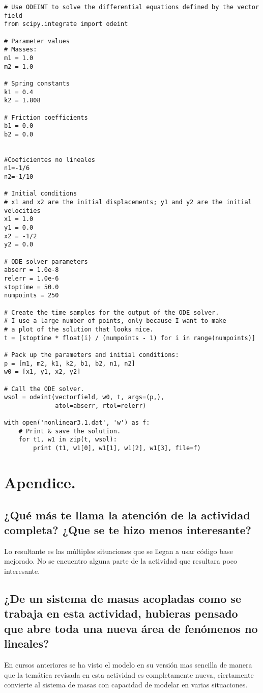 \documentclass{article}
\begin{document}
\begin{verbatim}
# Use ODEINT to solve the differential equations defined by the vector field
from scipy.integrate import odeint

# Parameter values
# Masses:
m1 = 1.0
m2 = 1.0

# Spring constants
k1 = 0.4
k2 = 1.808

# Friction coefficients
b1 = 0.0
b2 = 0.0


#Coeficientes no lineales
n1=-1/6
n2=-1/10

# Initial conditions
# x1 and x2 are the initial displacements; y1 and y2 are the initial velocities
x1 = 1.0
y1 = 0.0
x2 = -1/2
y2 = 0.0

# ODE solver parameters
abserr = 1.0e-8
relerr = 1.0e-6
stoptime = 50.0
numpoints = 250

# Create the time samples for the output of the ODE solver.
# I use a large number of points, only because I want to make
# a plot of the solution that looks nice.
t = [stoptime * float(i) / (numpoints - 1) for i in range(numpoints)]

# Pack up the parameters and initial conditions:
p = [m1, m2, k1, k2, b1, b2, n1, n2]
w0 = [x1, y1, x2, y2]

# Call the ODE solver.
wsol = odeint(vectorfield, w0, t, args=(p,),
              atol=abserr, rtol=relerr)

with open('nonlinear3.1.dat', 'w') as f:
    # Print & save the solution.
    for t1, w1 in zip(t, wsol):
        print (t1, w1[0], w1[1], w1[2], w1[3], file=f)
\end{verbatim}
\section{Apendice.}
\subsection{¿Qué más te llama la atención de la actividad completa? ¿Que se te hizo menos interesante?}
Lo resultante es las múltiples situaciones que se llegan a usar código base mejorado. No se encuentro alguna parte de la actividad que resultara poco interesante.
\subsection{¿De un sistema de masas acopladas como se trabaja en esta actividad, hubieras pensado que abre toda una nueva área de fenómenos no lineales?}
En cursos anteriores se ha visto el modelo en su versión mas sencilla de manera que la temática revisada en esta actividad es completamente nueva, ciertamente convierte al sistema de masas con capacidad de modelar en varias situaciones.
\end{document}
